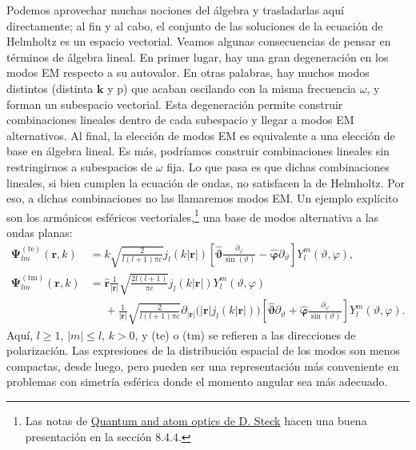 Podemos aprovechar muchas nociones del álgebra y trasladarlas aquí directamente; al fin y al cabo, el conjunto de las soluciones de la ecuación de Helmholtz es un espacio vectorial. Veamos algunas consecuencias de pensar en términos de álgebra lineal. En primer lugar, hay una gran degeneración en los modos EM respecto a su autovalor. En otras palabras, hay muchos modos distintos (distinta \(\mathbf{k}\) y \(\mathrm{p}\)) que acaban oscilando con la misma frecuencia \(\omega\), y forman un subespacio vectorial. Esta degeneración permite construir combinaciones lineales dentro de cada subespacio y llegar a modos EM alternativos. Al final, la elección de modos EM es equivalente a una elección de base en álgebra lineal. Es más, podríamos construir combinaciones lineales sin restringirnos a subespacios de \(\omega\) fija. Lo que pasa es que dichas combinaciones lineales, si bien cumplen la ecuación de ondas, no satisfacen la de Helmholtz. Por eso, a dichas combinaciones no las llamaremos modos EM. Un ejemplo explícito son los armónicos esféricos vectoriales,\footnote{Las notas de \href{https://atomoptics.uoregon.edu/~dsteck/teaching/quantum-optics/}{Quantum and atom optics de D. Steck} hacen una buena presentación en la sección 8.4.4.} una base de modos alternativa a las ondas planas:
\begin{subequations}
    \begin{align}
        \boldsymbol{\Psi}^{\mathrm{(te)}}_{lm}(\mathbf{r}, k) &= k \sqrt{\frac{2}{l(l+1)\pi c}} j_l(k|\mathbf{r}|)\left[\hat{\boldsymbol{\vartheta}}\frac{\partial_\varphi}{\sin(\vartheta)} - \hat{\boldsymbol{\varphi}}\partial_\vartheta\right]Y_{l}^m(\vartheta,\varphi),\\
        \boldsymbol{\Psi}^{\mathrm{(tm)}}_{lm}(\mathbf{r}, k) &= \hat{\mathbf{r}} \frac{1}{|\mathbf{r}|}\sqrt{\frac{2l(l+1)}{\pi c}} j_l(k|\mathbf{r}|) Y_l^m(\vartheta, \varphi)\\
        \nonumber
        &\phantom{=}+ \frac{1}{|\mathbf{r}|} \sqrt{\frac{2}{l(l+1)\pi c}} \partial_{|\mathbf{r}|}\big(|\mathbf{r}|j_l(k|\mathbf{r}|)\big) \left[\hat{\boldsymbol{\vartheta}}\partial_\vartheta + \hat{\boldsymbol{\varphi}}\frac{\partial_\varphi}{\sin(\vartheta)}\right]Y_{l}^m(\vartheta,\varphi).
    \end{align}
\end{subequations}
Aquí, \(l\geq 1\), \(|m|\leq l\), \(k>0\), y (te) o (tm) se refieren a las direcciones de polarización. Las expresiones de la distribución espacial de los modos son menos compactas, desde luego, pero pueden ser una representación más conveniente en problemas con simetría esférica donde el momento angular sea más adecuado.

